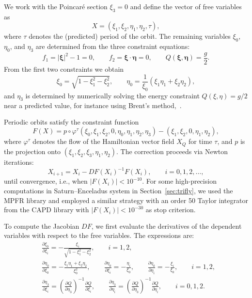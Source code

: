 \documentclass[pdflatex,sn-mathphys-ay]{sn-jnl}%
\theoremstyle{thmstyleone}%
\theoremstyle{thmstyletwo}%
\theoremstyle{thmstylethree}%
\renewcommand{\phi}{\varphi}
\begin{document}
We work with the Poincar\'e section $\xi_3 = 0$ and define the vector of free variables as
\[
    X = (\xi_1, \xi_2, \eta_1, \eta_2, \tau),
\]
where $\tau$ denotes the (predicted) period of the orbit. The remaining variables $\xi_0$, $\eta_0$, and $\eta_3$ are determined from the three constraint equations:
\[
    f_1 = |\boldsymbol{\xi}|^2 - 1 = 0, \qquad 
    f_2 = \boldsymbol{\xi} \cdot \boldsymbol{\eta} = 0, \qquad 
    Q(\boldsymbol{\xi}, \boldsymbol{\eta}) = \frac{g}{2}.
\]
From the first two constraints we obtain
\[
    \xi_0 = \sqrt{1 - \xi_1^2 - \xi_2^2}, \qquad 
    \eta_0 = \frac{1}{\xi_0}(\xi_1 \eta_1 + \xi_2 \eta_2),
\]
and $\eta_3$ is determined by numerically solving the energy constraint $Q(\xi, \eta) = g/2$ near a predicted value, for instance using Brent's method,~\cite{brent_algorithm_1971}.

Periodic orbits satisfy the constraint function
\[
    F(X) = p \circ \phi^{\tau}(\xi_0, \xi_1, \xi_2, 0, \eta_0, \eta_1, \eta_2, \eta_3) 
    - (\xi_1, \xi_2, 0, \eta_1, \eta_2),
\]
where $\phi^{\tau}$ denotes the flow of the Hamiltonian vector field $X_Q$ for time $\tau$, and $p$ is the projection onto $(\xi_1, \xi_2, \xi_3, \eta_1, \eta_2)$. The correction proceeds via Newton iterations:
\[
    X_{i+1} = X_i - DF(X_i)^{-1} F(X_i), \qquad i = 0, 1, 2, \dots,
\]
until convergence, i.e., when $|F(X_i)| < 10^{-10}$. For some high-precision computations in Saturn--Enceladus system in Section~\ref{sec:trifly}, we used the MPFR library and employed a similar strategy with an order 50 Taylor integrator from the CAPD library with $|F(X_i)| < 10^{-30}$ as stop criterion.

To compute the Jacobian $DF$, we first evaluate the derivatives of the dependent variables with respect to the free variables. The expressions are:
\begin{align*}
    & \frac{\partial \xi_0}{\partial \xi_i} = - \frac{\xi_i}{\sqrt{1 - \xi_1^2 - \xi_2^2}}, \qquad i = 1, 2, \\
    & \frac{\partial \eta_0}{\partial \xi_0} = - \frac{\xi_1 \eta_1 + \xi_2 \eta_2}{\xi_0^2}, \qquad
    \frac{\partial \eta_0}{\partial \xi_i} = -\frac{\eta_i}{\xi_0}, \qquad 
      \frac{\partial \eta_0}{\partial \eta_i} = -\frac{\xi_i}{\xi_0}, \qquad i = 1, 2, \\
    & \frac{\partial \eta_3}{\partial \xi_i} = 
        \left( \frac{\partial Q}{\partial \eta_3} \right)^{-1} 
        \frac{\partial Q}{\partial \xi_i}, \qquad
    \frac{\partial \eta_3}{\partial \eta_i} = 
        \left( \frac{\partial Q}{\partial \eta_3} \right)^{-1} 
        \frac{\partial Q}{\partial \eta_i}, \qquad i = 0, 1, 2.
\end{align*}
\end{document}
